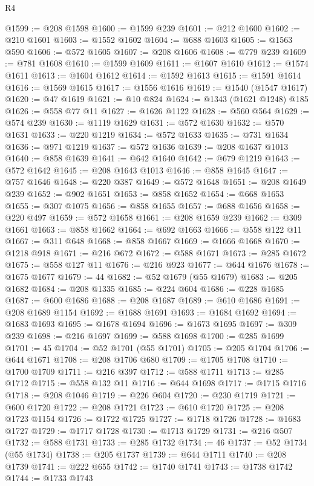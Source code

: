 \begin{lexlean}{R4}
\begin{coremodule}
@1599 := @208 @1598
@1600 := @1599 @239
@1601 := @212 @1600
@1602 := @210 @1601
@1603 := @1552 @1602
@1604 := @688 @1603
@1605 := @1563 @590
@1606 := @572 @1605
@1607 := @208 @1606
@1608 := @779 @239
@1609 := @781 @1608
@1610 := @1599 @1609
@1611 := @1607 @1610
@1612 := @1574 @1611
@1613 := @1604 @1612
@1614 := @1592 @1613
@1615 := @1591 @1614
@1616 := @1569 @1615
@1617 := @1556 @1616
@1619 := @1540 (@1547 @1617)
@1620 := @47 @1619
@1621 := @10 @824
@1624 := @1343 (@1621 @1248) @185
@1626 := @558 @77 @11
@1627 := @1626 @1122
@1628 := @560 @564
@1629 := @574 @239
@1630 := @1119 @1629
@1631 := @572 @1630
@1632 := @570 @1631
@1633 := @220 @1219
@1634 := @572 @1633
@1635 := @731 @1634
@1636 := @971 @1219
@1637 := @572 @1636
@1639 := @208 @1637 @1013
@1640 := @858 @1639
@1641 := @642 @1640
@1642 := @679 @1219
@1643 := @572 @1642
@1645 := @208 @1643 @1013
@1646 := @858 @1645
@1647 := @757 @1646
@1648 := @220 @387
@1649 := @572 @1648
@1651 := @208 @1649 @239
@1652 := @902 @1651
@1653 := @858 @1652
@1654 := @668 @1653
@1655 := @307 @1075
@1656 := @858 @1655
@1657 := @688 @1656
@1658 := @220 @497
@1659 := @572 @1658
@1661 := @208 @1659 @239
@1662 := @309 @1661
@1663 := @858 @1662
@1664 := @692 @1663
@1666 := @558 @122 @11
@1667 := @311 @648
@1668 := @858 @1667
@1669 := @1666 @1668
@1670 := @1218 @918
@1671 := @216 @672
@1672 := @588 @1671
@1673 := @285 @1672
@1675 := @558 @127 @11
@1676 := @216 @923
@1677 := @644 @1676
@1678 := @1675 @1677
@1679 := 44
@1682 := @52 @1679 (@55 @1679)
@1683 := @205 @1682
@1684 := @208 @1335
@1685 := @224 @604
@1686 := @228 @1685
@1687 := @600 @1686
@1688 := @208 @1687
@1689 := @610 @1686
@1691 := @208 @1689 @1154
@1692 := @1688 @1691
@1693 := @1684 @1692
@1694 := @1683 @1693
@1695 := @1678 @1694
@1696 := @1673 @1695
@1697 := @309 @239
@1698 := @216 @1697
@1699 := @588 @1698
@1700 := @285 @1699
@1701 := 45
@1704 := @52 @1701 (@55 @1701)
@1705 := @205 @1704
@1706 := @644 @1671
@1708 := @208 @1706 @680
@1709 := @1705 @1708
@1710 := @1700 @1709
@1711 := @216 @397
@1712 := @588 @1711
@1713 := @285 @1712
@1715 := @558 @132 @11
@1716 := @644 @1698
@1717 := @1715 @1716
@1718 := @208 @1046
@1719 := @226 @604
@1720 := @230 @1719
@1721 := @600 @1720
@1722 := @208 @1721
@1723 := @610 @1720
@1725 := @208 @1723 @1154
@1726 := @1722 @1725
@1727 := @1718 @1726
@1728 := @1683 @1727
@1729 := @1717 @1728
@1730 := @1713 @1729
@1731 := @216 @507
@1732 := @588 @1731
@1733 := @285 @1732
@1734 := 46
@1737 := @52 @1734 (@55 @1734)
@1738 := @205 @1737
@1739 := @644 @1711
@1740 := @208 @1739
@1741 := @222 @655
@1742 := @1740 @1741
@1743 := @1738 @1742
@1744 := @1733 @1743

\end{coremodule}
\end{lexlean}

